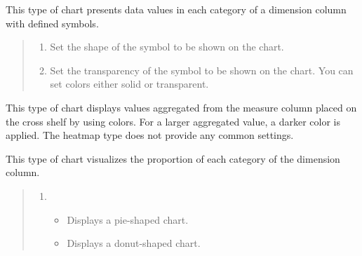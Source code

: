 \documentclass[letterpaper,10pt,english]{sphinxmanual}
\begin{document}
This type of chart presents data values in each category of a dimension column with defined symbols.
\begin{quote}

\begin{figure}[H]
\centering

\noindent{}
\end{figure}
\begin{enumerate}
\def\theenumi{\arabic{enumi}}
\def\labelenumi{\theenumi .}
\makeatletter\def\p@enumii{\p@enumi \theenumi .}\makeatother
\item {} 
 Set the shape of the symbol to be shown on the chart.

\item {} 
 Set the transparency of the symbol to be shown on the chart. You can set colors either solid or transparent.

\end{enumerate}
\end{quote}


This type of chart displays values aggregated from the measure column placed on the cross shelf by using colors. For a larger aggregated value, a darker color is applied. The heatmap type does not provide any common settings.
\begin{quote}

\begin{figure}[H]
\centering

\noindent{}
\end{figure}
\end{quote}


This type of chart visualizes the proportion of each category of the dimension column.
\begin{quote}

\begin{figure}[H]
\centering

\noindent{}
\end{figure}
\begin{enumerate}
\def\theenumi{\arabic{enumi}}
\def\labelenumi{\theenumi .}
\makeatletter\def\p@enumii{\p@enumi \theenumi .}\makeatother
\item {} 
\begin{itemize}
\item {} 
 Displays a pie-shaped chart.

\item {} 
 Displays a donut-shaped chart.

\end{itemize}

\end{enumerate}
\end{quote}
\end{document}
